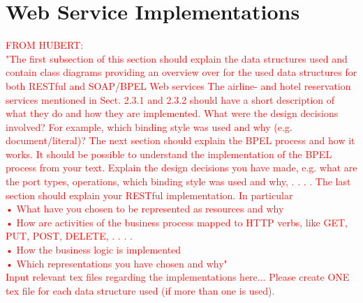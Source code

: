 \chapter{Web Service Implementations}
\textcolor{red}{FROM HUBERT:\\
"The first subsection of this section should explain the data structures used and contain class diagrams providing an overview over for the used data structures for both RESTful and SOAP/BPEL Web services The airline- and hotel reservation services mentioned in Sect. 2.3.1 and 2.3.2 should have a short description of what they do and how they are implemented. What were the design decisions involved?
For example, which binding style was used and why (e.g. document/literal)?
The next section should explain the BPEL process and how it works. It should be possible to
understand the implementation of the BPEL process from your text. Explain the design decisions you have made, e.g. what are the port types, operations, which binding style was used and why, . . . .
The last section should explain your RESTful implementation. In particular\\
• What have you chosen to be represented as resources and why\\
• How are activities of the business process mapped to HTTP verbs, like GET, PUT, POST, DELETE, . . . .\\
• How the business logic is implemented\\
• Which representations you have chosen and why"\\
Input relevant tex files regarding the implementations here...
Please create ONE tex file for each data structure used (if more than one is used).}





